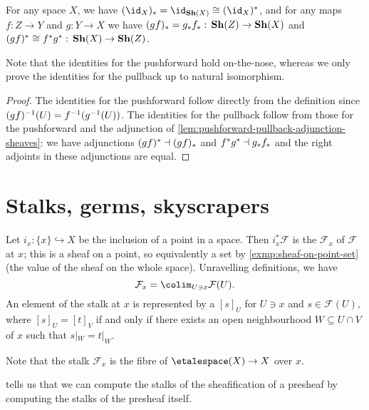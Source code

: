 \begin{cor}
For any space \(X\), we have \((\id_X)_*=\id_{\catSheaf(X)}\cong(\id_X)^*\), and for any maps \(f\colon Z\to Y\) and \(g\colon Y\to X\) we have \((gf)_*=g_*f_*\colon\catSheaf(Z)\to\catSheaf(X)\) and \((gf)^*\cong f^*g^*\colon\catSheaf(X)\to\catSheaf(Z)\).
\end{cor}
Note that the identities for the pushforward hold on-the-nose, whereas we only prove the identities for the pullback up to natural isomorphism.
\begin{proof}
The identities for the pushforward follow directly from the definition since \((gf)^{-1}(U)=f^{-1}(g^{-1}(U))\).
The identities for the pullback follow from those for the pushforward and the adjunction of \cref{lem:pushforward-pullback-adjunction-sheaves}: we have adjunctions \((gf)^*\dashv(gf)_*\) and \(f^*g^*\dashv g_*f_*\) and the right adjoints in these adjunctions are equal.
\end{proof}

\section{Stalks, germs, skyscrapers}

\begin{defn}\label{defn:stalk}
Let $i_x\colon \{x\} \hookrightarrow X$ be the inclusion of a point in a space.
Then $i_x^* \mathcal{F}$ is the  $\mathcal{F}_x$ of $\mathcal{F}$ at $x$; this is a sheaf on a point, so equivalently a set by \cref{exmp:sheaf-on-point-set} (the value of the sheaf on the whole space).
Unravelling definitions, we have \[
    \mathcal{F}_x = \colim_{U \ni x} \mathcal{F}(U)\text{.}
\]
An element of the stalk at $x$ is represented by a  $[s]_U$ for $U \ni x$ and $s \in \mathcal{F}(U)$, where \([s]_U = [t]_V\) if and only if there exists an open neighbourhood \(W\subseteq U\cap V\) of \(x\) such that \(s|_W=t|_W\).
\end{defn}
Note that the stalk $\mathcal{F}_x$ is the fibre of $\etalespace(X) \to X$ over $x$. 

\begin{rmk}
 tells us that we can compute the stalks of the sheafification of a presheaf by computing the stalks of the presheaf itself.
\end{rmk}

